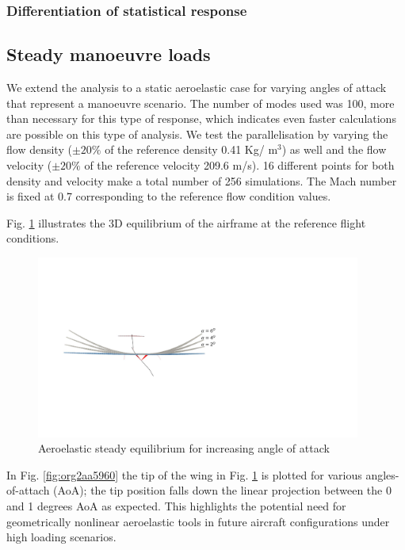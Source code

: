 \documentclass[11pt]{article}
\begin{document}
\subsubsection{Differentiation of statistical response}
\label{sec:org97aef95}

\subsection{Steady manoeuvre loads}
\label{sec:org1c8afec}
We extend the analysis to a static aeroelastic case for varying angles of attack that represent a manoeuvre scenario. The number of modes used was 100, more than necessary for this type of response, which indicates even faster calculations are possible on this type of analysis. We test the parallelisation by varying the flow density (\(\pm 20 \%\) of the reference density 0.41 Kg/ m\(^3\)) as well and the flow velocity (\(\pm 20 \%\) of the reference velocity 209.6 m/s). 16 different points for both density and velocity make a total number of 256 simulations. The Mach number is fixed at 0.7 corresponding to the reference flow condition values.

Fig. \ref{fig:orgc023faf} illustrates the 3D equilibrium of the airframe at the reference flight conditions. 

\begin{figure}[htbp]
\centering
\includegraphics[width=0.95\textwidth]{figs_ext/monoeuvre3D.pdf}
\caption{\label{fig:orgc023faf}Aeroelastic steady equilibrium for increasing angle of attack}
\end{figure}

In Fig. \ref{fig:org2aa5960} the tip of the wing in Fig. \ref{fig:orgc023faf} is plotted for various angles-of-attach (AoA); the tip position falls down the linear projection between the 0 and 1 degrees AoA as expected. This highlights the potential need for geometrically nonlinear aeroelastic tools in future aircraft configurations under high loading scenarios. 
\end{document}
